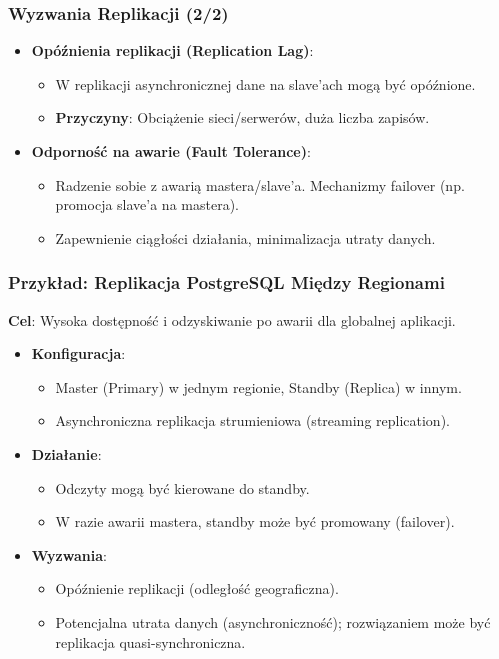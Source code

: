 \documentclass[aspectratio=169,xcolor=table]{beamer}
\begin{document}
\begin{frame}
  \frametitle{Wyzwania Replikacji (2/2)}
  \begin{itemize}
    \item \textbf{Opóźnienia replikacji (Replication Lag)}:
        \begin{itemize}
            \item W replikacji asynchronicznej dane na slave'ach mogą być opóźnione.
            \item \textbf{Przyczyny}: Obciążenie sieci/serwerów, duża liczba zapisów.
        \end{itemize}
    \item \textbf{Odporność na awarie (Fault Tolerance)}:
        \begin{itemize}
            \item Radzenie sobie z awarią mastera/slave'a. Mechanizmy failover (np. promocja slave'a na mastera).
            \item Zapewnienie ciągłości działania, minimalizacja utraty danych.
        \end{itemize}
  \end{itemize}
\end{frame}

\begin{frame}
  \frametitle{Przykład: Replikacja PostgreSQL Między Regionami}
  \textbf{Cel}: Wysoka dostępność i odzyskiwanie po awarii dla globalnej aplikacji.
  \begin{itemize}
    \item \textbf{Konfiguracja}:
        \begin{itemize}
            \item Master (Primary) w jednym regionie, Standby (Replica) w innym.
            \item Asynchroniczna replikacja strumieniowa (streaming replication).
        \end{itemize}
    \item \textbf{Działanie}:
        \begin{itemize}
            \item Odczyty mogą być kierowane do standby.
            \item W razie awarii mastera, standby może być promowany (failover).
        \end{itemize}
    \item \textbf{Wyzwania}:
        \begin{itemize}
            \item Opóźnienie replikacji (odległość geograficzna).
            \item Potencjalna utrata danych (asynchroniczność); rozwiązaniem może być replikacja quasi-synchroniczna.
        \end{itemize}
  \end{itemize}
\end{frame}
\end{document}
